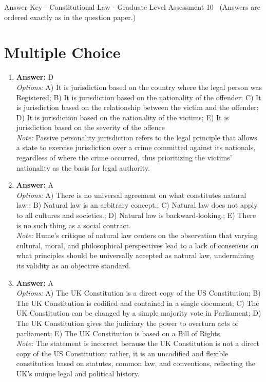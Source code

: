 \documentclass[12pt]{article}
\begin{document}
\begin{center}
Answer Key - Constitutional Law - Graduate Level Assessment 10 \
\small (Answers are ordered exactly as in the question paper.)
\end{center}

\section*{Multiple Choice}
\begin{enumerate}[label=\arabic*.]
\item \textbf{Answer:} D
\\ \textit{Options:} A) It is jurisdiction based on the country where the legal person was Registered; B) It is jurisdiction based on the nationality of the offender; C) It is jurisdiction based on the relationship between the victim and the offender; D) It is jurisdiction based on the nationality of the victims; E) It is jurisdiction based on the severity of the offence
\\ \textit{Note:} Passive personality jurisdiction refers to the legal principle that allows a state to exercise jurisdiction over a crime committed against its nationals, regardless of where the crime occurred, thus prioritizing the victims' nationality as the basis for legal authority.
\item \textbf{Answer:} A
\\ \textit{Options:} A) There is no universal agreement on what constitutes natural law.; B) Natural law is an arbitrary concept.; C) Natural law does not apply to all cultures and societies.; D) Natural law is backward-looking.; E) There is no such thing as a social contract.
\\ \textit{Note:} Hume's critique of natural law centers on the observation that varying cultural, moral, and philosophical perspectives lead to a lack of consensus on what principles should be universally accepted as natural law, undermining its validity as an objective standard.
\item \textbf{Answer:} A
\\ \textit{Options:} A) The UK Constitution is a direct copy of the US Constitution; B) The UK Constitution is codified and contained in a single document; C) The UK Constitution can be changed by a simple majority vote in Parliament; D) The UK Constitution gives the judiciary the power to overturn acts of parliament; E) The UK Constitution is based on a Bill of Rights
\\ \textit{Note:} The statement is incorrect because the UK Constitution is not a direct copy of the US Constitution; rather, it is an uncodified and flexible constitution based on statutes, common law, and conventions, reflecting the UK's unique legal and political history.

\end{enumerate}
\end{document}
